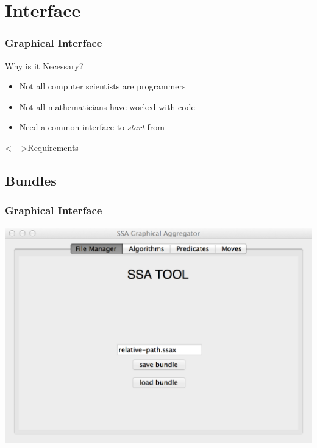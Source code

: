 \documentclass{beamer}
\begin{document}
\section{Interface}
\ifTOC\frame{\tableofcontents[currentsection]}\fi
\begin{frame}
  \frametitle{Graphical Interface}
  \begin{block}{Why is it Necessary?}
    \begin{itemize}[<+->]
    \item Not all computer scientists are programmers
    \item Not all mathematicians have worked with code
    \item Need a common interface to \emph{start} from
    \end{itemize}
  \end{block}
  \begin{block}<+->{Requirements}
  \end{block}
\end{frame}

\subsection{Bundles}
\begin{frame}
  \frametitle{Graphical Interface}
  \centering
  \includegraphics[width=\textwidth]{../figs/3-2}
\end{frame}
\end{document}
